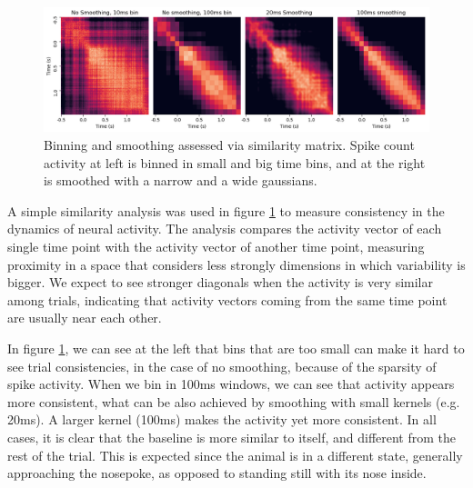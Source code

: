     \begin{figure}
        \centering
        \includegraphics[width=\textwidth]{figures/similarity_comparison.png}
        \caption[Binning and smoothing assessed via similarity matrix]{Binning and smoothing assessed via similarity matrix. Spike count activity at left is binned in small and big time bins, and at the right is smoothed with a narrow and a wide gaussians.}
        \label{fig:mahalanobis_smoothing} 
    \end{figure} %
    
    A simple similarity analysis was used in figure \ref{fig:mahalanobis_smoothing} to measure consistency in the dynamics of neural activity. The analysis compares the activity vector of each single time point with the activity vector of another time point, measuring proximity in a space that considers less strongly dimensions in which variability is bigger. We expect to see stronger diagonals when the activity is very similar among trials, indicating that activity vectors coming from the same time point are usually near each other.
    
    In figure \ref{fig:mahalanobis_smoothing}, we can see at the left that bins that are too small can make it hard to see trial consistencies, in the case of no smoothing, because of the sparsity of spike activity. When we bin in 100ms windows, we can see that activity appears more consistent, what can be also achieved by smoothing with small kernels (e.g. 20ms). A larger kernel (100ms) makes the activity yet more consistent. 
    In all cases, it is clear that the baseline is more similar to itself, and different from the rest of the trial. This is expected since the animal is in a different state, generally approaching the nosepoke, as opposed to standing still with its nose inside. 